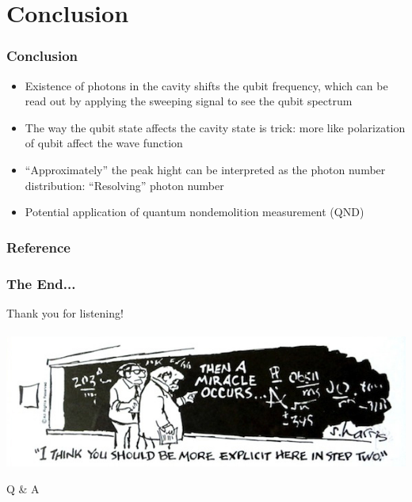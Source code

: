 \documentclass[xcolor=dvipsnames,hyperref={CJKbookmarks=true}]{beamer}
\begin{document}
\section{Conclusion}
\begin{frame}[t]\frametitle{Conclusion}
\begin{itemize}
	\item Existence of photons in the cavity shifts the qubit frequency, 
	which can be read out by applying the sweeping signal to see the qubit 
	spectrum
	\item The way the qubit state affects the cavity state is trick: more 
	like polarization of qubit affect the wave function\pause
	\vspace{10pt}
	\item ``Approximately'' the peak hight can be interpreted as the photon 
	number distribution: ``Resolving'' photon number
	\item Potential application of quantum nondemolition measurement (QND)
\end{itemize}
\end{frame}

\begin{frame}%
    \frametitle{Reference}
	\small
    
\end{frame}

\begin{frame}\frametitle{The End...}
\centering
\Large
Thank you for listening! 
~\\
~\\

\includegraphics[width=\linewidth]{miracle-occurs2.jpg}

Q \& A
\end{frame}

\appendix

\end{document}
